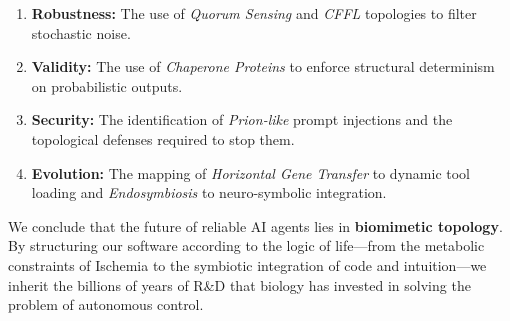 \documentclass[11pt, a4paper]{article}
\begin{document}
\begin{enumerate}
    \item \textbf{Robustness:} The use of \textit{Quorum Sensing} and \textit{CFFL} topologies to filter stochastic noise.
    \item \textbf{Validity:} The use of \textit{Chaperone Proteins} to enforce structural determinism on probabilistic outputs.
    \item \textbf{Security:} The identification of \textit{Prion-like} prompt injections and the topological defenses required to stop them.
    \item \textbf{Evolution:} The mapping of \textit{Horizontal Gene Transfer} to dynamic tool loading and \textit{Endosymbiosis} to neuro-symbolic integration.
\end{enumerate}

We conclude that the future of reliable AI agents lies in \textbf{biomimetic topology}. By structuring our software according to the logic of life---from the metabolic constraints of Ischemia to the symbiotic integration of code and intuition---we inherit the billions of years of R\&D that biology has invested in solving the problem of autonomous control.

\newpage

\printbibliography
\end{document}
